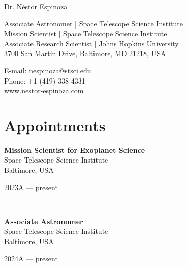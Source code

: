 \documentclass[12pt, a4paper]{article} %
\begin{document}

{\LARGE Dr. N\'estor Espinoza}\\[0.2cm] %
\begin{minipage}[t]{0.63\textwidth}
Associate Astronomer | Space Telescope Science Institute\\
Mission Scientist | Space Telescope Science Institute\\
Associate Research Scientist | Johns Hopkins University\\
3700 San Martin Drive, Baltimore, MD 21218, USA \\
\end{minipage}
\begin{minipage}[t]{0.37\textwidth}
E-mail: \href{mailto:nespinoza@stsci.edu}{nespinoza@stsci.edu}\\
Phone: +1 (419) 338 4331\\ 
\url{www.nestor-espinoza.com}
\end{minipage}

\hrulefill

\section*{Appointments}


\begin{minipage}[t]{0.6\textwidth}
\begin{flushleft}%
  \setlength{\leftskip}{0.2cm}%
\textbf{Mission Scientist for Exoplanet Science}\\
Space Telescope Science Institute\\
Baltimore, USA
 
\end{flushleft}
\end{minipage}
\begin{minipage}[t]{0.4\textwidth}
\hfill 2023A --- present 
\end{minipage}\\

\begin{minipage}[t]{0.6\textwidth}
\begin{flushleft}%
  \setlength{\leftskip}{0.2cm}%
\textbf{Associate Astronomer}\\
Space Telescope Science Institute\\
Baltimore, USA
 
\end{flushleft}
\end{minipage}
\begin{minipage}[t]{0.4\textwidth}
\hfill 2024A --- present 
\end{minipage}\\
\end{document}
